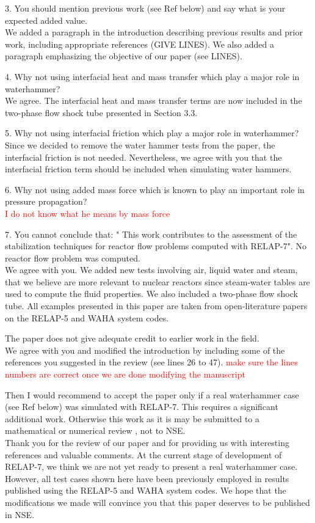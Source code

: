 \documentclass{article}
\newcommand{\tcr}[1]{\textcolor{red}{#1}}
\begin{document}
{\color{blue}
3. You should mention previous work (see Ref below) and say what is your expected added value. \\
}
We added a paragraph in the introduction describing previous results and prior work, including  appropriate references (GIVE LINES). We also added a paragraph emphasizing the objective of our paper (see LINES).

\bigskip

{\color{blue}
4. Why not using interfacial heat and mass transfer which play a major role in waterhammer? \\
}
We agree. The interfacial heat and mass transfer terms are now included in the two-phase flow shock tube presented in Section 3.3.
\bigskip

{\color{blue}
5. Why not using interfacial friction which play a major role in waterhammer? \\
}
Since we decided to remove the water hammer tests from the paper, the interfacial friction is not needed. Nevertheless, we agree with you that the interfacial friction term should be included when simulating water hammers.
\bigskip

{\color{blue}
6. Why not using added mass force which is known to play an important role in pressure propagation? \\
}
\tcr{I do not know what he means by mass force}
\bigskip

{\color{blue}
7. You cannot conclude that: " This work contributes to the assessment of the stabilization techniques for reactor flow problems computed with RELAP-7". No reactor flow problem was computed. \\
}
We agree with you. We added new tests involving air, liquid water and steam, that we believe are more relevant to nuclear reactors since steam-water tables are used to compute the fluid properties. We also included a two-phase flow shock tube. All examples presented in this paper are taken from open-literature papers on the RELAP-5 and WAHA system codes. 
\bigskip

{\color{blue}
The paper does not give adequate credit to earlier work in the field. \\
}
We agree with you and modified the introduction by including some of the references you suggested in the review (see lines 26 to 47).
\tcr{make sure the lines numbers are correct once we are done modifying the manuscript}

\bigskip

{\color{blue}
Then I would recommend to accept the paper only if a real waterhammer case (see Ref below) was simulated with RELAP-7. This requires a significant additional work.
Otherwise this work as it is may be submitted to a mathematical or numerical review , not to NSE. \\
}
Thank you for the review of our paper and for providing us with interesting references and valuable comments. At the current stage of development of RELAP-7, we think we are not yet ready to present a real waterhammer case. However, all test cases shown here have been previously employed in results published using the RELAP-5 and WAHA system codes. We hope that the modifications we made will convince you that this paper deserves to be published in NSE.
\end{document}

